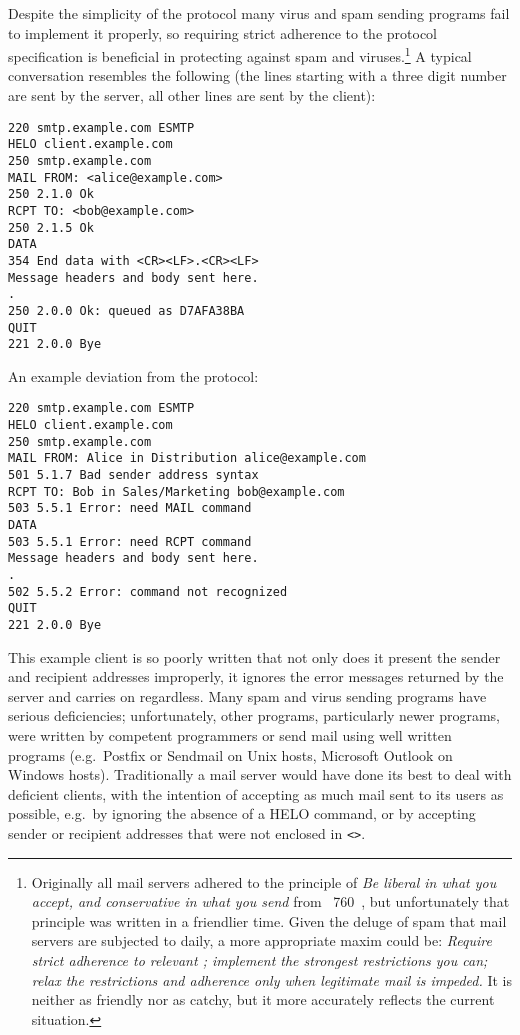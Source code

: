 \SMTPglossaryDescription{} Despite the simplicity of the protocol many
virus and spam sending programs fail to implement it properly, so requiring
strict adherence to the protocol specification is beneficial in protecting
against spam and viruses.\footnote{Originally all mail servers adhered to
the principle of \textit{Be liberal in what you accept, and conservative in
what you send\/} from ~760~\cite{rfc760}, but unfortunately
that principle was written in a friendlier time.  Given the deluge of spam
that mail servers are subjected to daily, a more appropriate maxim could
be: \textit{Require strict adherence to relevant ; implement
the strongest restrictions you can; relax the restrictions and adherence
only when legitimate mail is impeded.\/}  It is neither as friendly nor as
catchy, but it more accurately reflects the current situation.} A typical
 conversation resembles the following (the lines starting
with a three digit number are sent by the server, all other lines are sent
by the client):

\begin{verbatim}
220 smtp.example.com ESMTP
HELO client.example.com
250 smtp.example.com
MAIL FROM: <alice@example.com>
250 2.1.0 Ok
RCPT TO: <bob@example.com>
250 2.1.5 Ok
DATA
354 End data with <CR><LF>.<CR><LF>
Message headers and body sent here.
.
250 2.0.0 Ok: queued as D7AFA38BA
QUIT
221 2.0.0 Bye
\end{verbatim}

An example deviation from the protocol:

\begin{verbatim}
220 smtp.example.com ESMTP
HELO client.example.com
250 smtp.example.com
MAIL FROM: Alice in Distribution alice@example.com
501 5.1.7 Bad sender address syntax
RCPT TO: Bob in Sales/Marketing bob@example.com
503 5.5.1 Error: need MAIL command
DATA
503 5.5.1 Error: need RCPT command
Message headers and body sent here.
.
502 5.5.2 Error: command not recognized
QUIT
221 2.0.0 Bye
\end{verbatim}

This example client is so poorly written that not only does it present the
sender and recipient addresses improperly, it ignores the error messages
returned by the server and carries on regardless.  Many spam and virus
sending programs have serious deficiencies; unfortunately, other programs,
particularly newer programs, were written by competent programmers or send
mail using well written programs (e.g.\ Postfix or Sendmail on Unix hosts,
Microsoft Outlook on Windows hosts).  Traditionally a mail server would
have done its best to deal with deficient clients, with the intention of
accepting as much mail sent to its users as possible, e.g.\ by ignoring the
absence of a HELO command, or by accepting sender or recipient addresses
that were not enclosed in \texttt{<>}.

